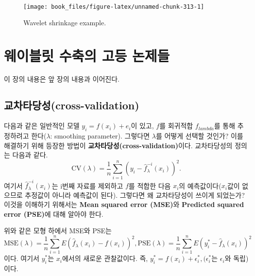 \documentclass[b5paper,]{scrbook}
\theoremstyle{plain}
\theoremstyle{definition}
\numberwithin{equation}{section}
\begin{document}
\begin{figure}

{\centering \texttt{[image: book\_files/figure-latex/unnamed-chunk-313-1]} 

}

\caption{Wavelet shrinkage example.}\label{fig:unnamed-chunk-313}
\end{figure}

\hypertarget{advwaveletshrinkage}{%
\chapter{웨이블릿 수축의 고등 논제들}\label{advwaveletshrinkage}}

이 장의 내용은 앞 장의 내용과 이어진다.

\hypertarget{cross-validation}{%
\section{교차타당성(cross-validation)}\label{cross-validation}}

다음과 같은 일반적인 모델 \(y_{i}=f(x_{i})+e_{i}\)이 있고, \(f\)를 회귀적합 \(f_{lambda}\)를 통해 추정하려고 한다(\(\lambda\): smoothing parameter). 그렇다면 \(\lambda\)를 어떻게 선택할 것인가? 이를 해결하기 위해 등장한 방법이 \textbf{교차타당성(cross-validation)}이다. 교차타당성의 정의는 다음과 같다.
\[\text{CV}(\lambda)=\frac{1}{n}\sum_{i=1}^{n}(y_{i}-\hat{f}_{\lambda}^{-i}(x_{i}))^{2}.\]
여기서 \(\hat{f}_{\lambda}^{-i}(x_{i})\)는 i번째 자료를 제외하고 \(f\)를 적합한 다음 \(x_{i}\)의 예측값이다(\(x_{i}\)값이 없으므로 추정값이 아니라 예측값이 된다). 그렇다면 왜 교차타당성이 쓰이게 되었는가? 이것을 이해하기 위해서는 \textbf{Mean squared error (MSE)}와 \textbf{Predicted squared error (PSE)}에 대해 알아야 한다.

위와 같은 모형 하에서 MSE와 PSE는
\[\text{MSE}(\lambda)=\frac{1}{n}\sum_{i=1}^{n}E(\hat{f}_{\lambda}(x_{i})-f(x_{i}))^{2}, \text{PSE}(\lambda)=\frac{1}{n}\sum_{i=1}^{n}E(y_{i}^{*}-\hat{f}_{\lambda}(x_{i}))^{2}\]
이다. 여기서 \(y_{i}^{*}\)는 \(x_{i}\)에서의 새로운 관찰값이다. 즉, \(y_{i}^{*}=f(x_{i})+\epsilon_{i}^{*}, (\epsilon_{i}^{*}\)는 \(\epsilon_{i}\)와 독립)이다.
\end{document}
